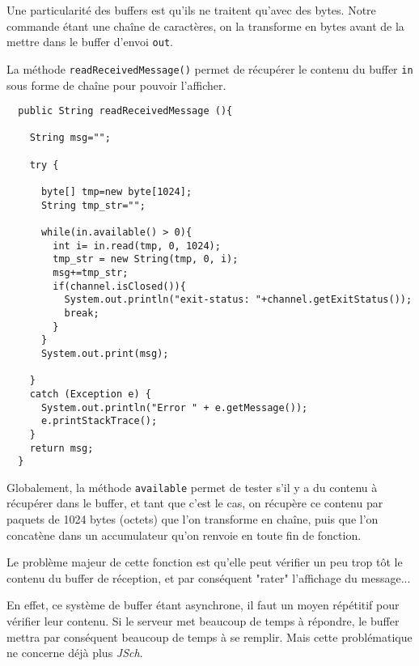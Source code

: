 \par Une particularité des buffers est qu'ils ne traitent qu'avec des bytes. Notre commande étant une chaîne de caractères, on la transforme en bytes avant de la mettre dans le buffer d'envoi \texttt{out}.
\par La méthode \texttt{readReceivedMessage()} permet de récupérer le contenu du buffer \texttt{in} sous forme de chaîne pour pouvoir l'afficher.

\begin{verbatim}
  public String readReceivedMessage (){
    
    String msg="";
    
    try {
      
      byte[] tmp=new byte[1024];
      String tmp_str="";
      
      while(in.available() > 0){
        int i= in.read(tmp, 0, 1024);
        tmp_str = new String(tmp, 0, i);
        msg+=tmp_str;
        if(channel.isClosed()){
          System.out.println("exit-status: "+channel.getExitStatus());
          break;
        }
      }
      System.out.print(msg);
      
    }
    catch (Exception e) {
      System.out.println("Error " + e.getMessage());
      e.printStackTrace();
    }
    return msg;
  }
\end{verbatim}

\par Globalement, la méthode \texttt{available} permet de tester s'il y a du contenu à récupérer dans le buffer, et tant que c'est le cas, on récupère ce contenu par paquets de 1024 bytes (octets) que l'on transforme en chaîne, puis que l'on concatène dans un accumulateur qu'on renvoie en toute fin de fonction.

\par Le problème majeur de cette fonction est qu'elle peut vérifier un peu trop tôt le contenu du buffer de réception, et par conséquent "rater" l'affichage du message...

\par En effet, ce système de buffer étant asynchrone, il faut un moyen répétitif pour vérifier leur contenu. Si le serveur met beaucoup de temps à répondre, le buffer mettra par conséquent beaucoup de temps à se remplir. Mais cette problématique ne concerne déjà plus \emph{JSch}.

